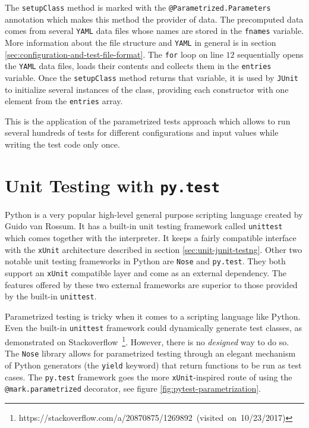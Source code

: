 The \texttt{setupClass} method is marked with the \texttt{@Parametrized.Parameters} annotation which makes this method the provider of data. The precomputed data comes from several \texttt{YAML} data files whose names are stored in the \texttt{fnames} variable. More information about the file structure and \texttt{YAML} in general is in section \ref{sec:configuration-and-test-file-format}. The \texttt{for} loop on line \(12\) sequentially opens the \texttt{YAML} data files, loads their contents and collects them in the \texttt{entries} variable. Once the \texttt{setupClass} method returns that variable, it is used by \texttt{JUnit} to initialize several instances of the class, providing each constructor with one element from the \texttt{entries} array.

This is the application of the parametrized tests approach which allows to run several hundreds of tests for different configurations and input values while writing the test code only once.

\section{Unit Testing with \texttt{py.test}}
\label{sec:unit-pytest}

Python is a very popular high-level general purpose scripting language created by Guido van Rossum. It has a built-in unit testing framework called \texttt{unittest} which comes together with the interpreter. It keeps a fairly compatible interface with the \texttt{xUnit} architecture described in section \ref{sec:unit-junit-testng}. Other two notable unit testing frameworks in Python are \texttt{Nose} and \texttt{py.test}. They both support an \texttt{xUnit} compatible layer and come as an external dependency. The features offered by these two external frameworks are superior to those provided by the built-in \texttt{unittest}.

Parametrized testing is tricky when it comes to a scripting language like Python. Even the built-in \texttt{unittest} framework could dynamically generate test classes, as demonstrated on \mbox{Stackoverflow \footnote{https://stackoverflow.com/a/20870875/1269892 (visited on 10/23/2017)}}. However, there is no \emph{designed} way to do so. The \texttt{Nose} library allows for parametrized testing through an elegant mechanism of Python generators (the \texttt{yield} keyword) that return functions to be run as test cases. The \texttt{py.test} framework goes the more \texttt{xUnit}-inspired route of using the \texttt{@mark.parametrized} decorator, see figure \ref{fig:pytest-parametrization}.

